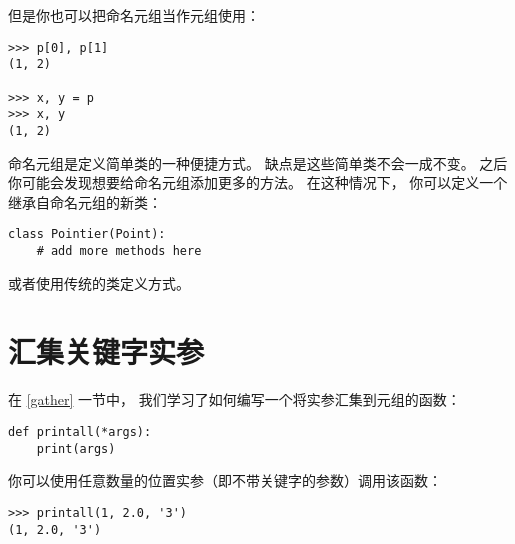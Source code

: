 
但是你也可以把命名元组当作元组使用：

\begin{lstlisting}
>>> p[0], p[1]
(1, 2)

>>> x, y = p
>>> x, y
(1, 2)
\end{lstlisting}


命名元组是定义简单类的一种便捷方式。  
缺点是这些简单类不会一成不变。  
之后你可能会发现想要给命名元组添加更多的方法。  
在这种情况下， 你可以定义一个继承自命名元组的新类：

\begin{lstlisting}
class Pointier(Point):
    # add more methods here
\end{lstlisting}


或者使用传统的类定义方式。

\section{汇集关键字实参}


在 \ref{gather} 一节中， 我们学习了如何编写一个将实参汇集到元组的函数：

\begin{lstlisting}
def printall(*args):
    print(args)
\end{lstlisting}


你可以使用任意数量的位置实参（即不带关键字的参数）调用该函数：

\begin{lstlisting}
>>> printall(1, 2.0, '3')
(1, 2.0, '3')
\end{lstlisting}

